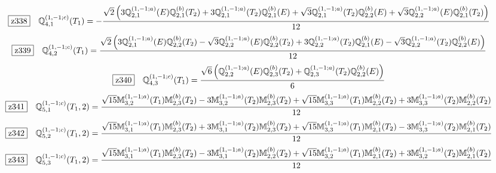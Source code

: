 \documentclass[fleqn,10pt,landscape]{jsarticle}
\begin{document}
\begin{dmath*}
\hspace*{3mm}\fbox{z338}\quad \mathbb{Q}_{4,1}^{(1,-1;c)}(T_{1})=- \frac{\sqrt{2} \left(3 \mathbb{Q}_{2,1}^{(1,-1;a)}(E) \mathbb{Q}_{2,1}^{(b)}(T_{2}) + 3 \mathbb{Q}_{2,1}^{(1,-1;a)}(T_{2}) \mathbb{Q}_{2,1}^{(b)}(E) + \sqrt{3} \mathbb{Q}_{2,1}^{(1,-1;a)}(T_{2}) \mathbb{Q}_{2,2}^{(b)}(E) + \sqrt{3} \mathbb{Q}_{2,2}^{(1,-1;a)}(E) \mathbb{Q}_{2,1}^{(b)}(T_{2})\right)}{12}
\end{dmath*}
\begin{dmath*}
\hspace*{3mm}\fbox{z339}\quad \mathbb{Q}_{4,2}^{(1,-1;c)}(T_{1})=\frac{\sqrt{2} \left(3 \mathbb{Q}_{2,1}^{(1,-1;a)}(E) \mathbb{Q}_{2,2}^{(b)}(T_{2}) - \sqrt{3} \mathbb{Q}_{2,2}^{(1,-1;a)}(E) \mathbb{Q}_{2,2}^{(b)}(T_{2}) + 3 \mathbb{Q}_{2,2}^{(1,-1;a)}(T_{2}) \mathbb{Q}_{2,1}^{(b)}(E) - \sqrt{3} \mathbb{Q}_{2,2}^{(1,-1;a)}(T_{2}) \mathbb{Q}_{2,2}^{(b)}(E)\right)}{12}
\end{dmath*}
\begin{dmath*}
\hspace*{3mm}\fbox{z340}\quad \mathbb{Q}_{4,3}^{(1,-1;c)}(T_{1})=\frac{\sqrt{6} \left(\mathbb{Q}_{2,2}^{(1,-1;a)}(E) \mathbb{Q}_{2,3}^{(b)}(T_{2}) + \mathbb{Q}_{2,3}^{(1,-1;a)}(T_{2}) \mathbb{Q}_{2,2}^{(b)}(E)\right)}{6}
\end{dmath*}
\begin{dmath*}
\hspace*{3mm}\fbox{z341}\quad \mathbb{Q}_{5,1}^{(1,-1;c)}(T_{1},2)=\frac{\sqrt{15} \mathbb{M}_{3,2}^{(1,-1;a)}(T_{1}) \mathbb{M}_{2,3}^{(b)}(T_{2}) - 3 \mathbb{M}_{3,2}^{(1,-1;a)}(T_{2}) \mathbb{M}_{2,3}^{(b)}(T_{2}) + \sqrt{15} \mathbb{M}_{3,3}^{(1,-1;a)}(T_{1}) \mathbb{M}_{2,2}^{(b)}(T_{2}) + 3 \mathbb{M}_{3,3}^{(1,-1;a)}(T_{2}) \mathbb{M}_{2,2}^{(b)}(T_{2})}{12}
\end{dmath*}
\begin{dmath*}
\hspace*{3mm}\fbox{z342}\quad \mathbb{Q}_{5,2}^{(1,-1;c)}(T_{1},2)=\frac{\sqrt{15} \mathbb{M}_{3,1}^{(1,-1;a)}(T_{1}) \mathbb{M}_{2,3}^{(b)}(T_{2}) + 3 \mathbb{M}_{3,1}^{(1,-1;a)}(T_{2}) \mathbb{M}_{2,3}^{(b)}(T_{2}) + \sqrt{15} \mathbb{M}_{3,3}^{(1,-1;a)}(T_{1}) \mathbb{M}_{2,1}^{(b)}(T_{2}) - 3 \mathbb{M}_{3,3}^{(1,-1;a)}(T_{2}) \mathbb{M}_{2,1}^{(b)}(T_{2})}{12}
\end{dmath*}
\begin{dmath*}
\hspace*{3mm}\fbox{z343}\quad \mathbb{Q}_{5,3}^{(1,-1;c)}(T_{1},2)=\frac{\sqrt{15} \mathbb{M}_{3,1}^{(1,-1;a)}(T_{1}) \mathbb{M}_{2,2}^{(b)}(T_{2}) - 3 \mathbb{M}_{3,1}^{(1,-1;a)}(T_{2}) \mathbb{M}_{2,2}^{(b)}(T_{2}) + \sqrt{15} \mathbb{M}_{3,2}^{(1,-1;a)}(T_{1}) \mathbb{M}_{2,1}^{(b)}(T_{2}) + 3 \mathbb{M}_{3,2}^{(1,-1;a)}(T_{2}) \mathbb{M}_{2,1}^{(b)}(T_{2})}{12}
\end{dmath*}
\end{document}
